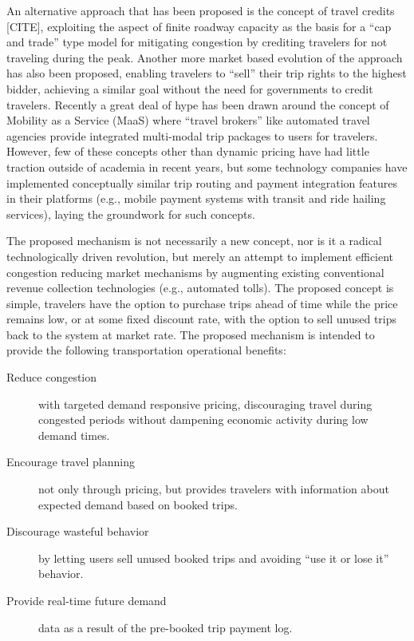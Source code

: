 \documentclass{article}
\begin{document}
An alternative approach that has been proposed is the concept of travel credits [CITE], exploiting the aspect of finite roadway capacity as the basis for a ``cap and trade'' type model for mitigating congestion by crediting travelers for not traveling during the peak. Another more market based evolution of the approach has also been proposed, enabling travelers to ``sell'' their trip rights to the highest bidder, achieving a similar goal without the need for governments to credit travelers. Recently a great deal of hype has been drawn around the concept of Mobility as a Service (MaaS) where ``travel brokers'' like automated travel agencies provide integrated multi-modal trip packages to users for travelers. However, few of these concepts other than dynamic pricing have had little traction outside of academia in recent years, but some technology companies have implemented conceptually similar trip routing and payment integration features in their platforms (e.g., mobile payment systems with transit and ride hailing services), laying the groundwork for such concepts. 

The proposed mechanism is not necessarily a new concept, nor is it a radical technologically driven revolution, but merely an attempt to implement efficient congestion reducing market mechanisms by augmenting existing conventional revenue collection technologies (e.g., automated tolls). The proposed concept is simple, travelers have the option to purchase trips ahead of time while the price remains low, or at some fixed discount rate, with the option to sell unused trips back to the system at market rate. The proposed mechanism is intended to provide the following transportation operational benefits:
\begin{description}
	\item[Reduce congestion] with targeted demand responsive pricing, discouraging travel during congested periods without dampening economic activity during low demand times.
	
	\item[Encourage travel planning] not only through pricing, but provides travelers with information about expected demand based on booked trips.
	
	\item[Discourage wasteful behavior] by letting users sell unused booked trips and avoiding ``use it or lose it'' behavior.
	
	\item[Provide real-time future demand] data as a result of the pre-booked trip payment log.
\end{description}
\end{document}
